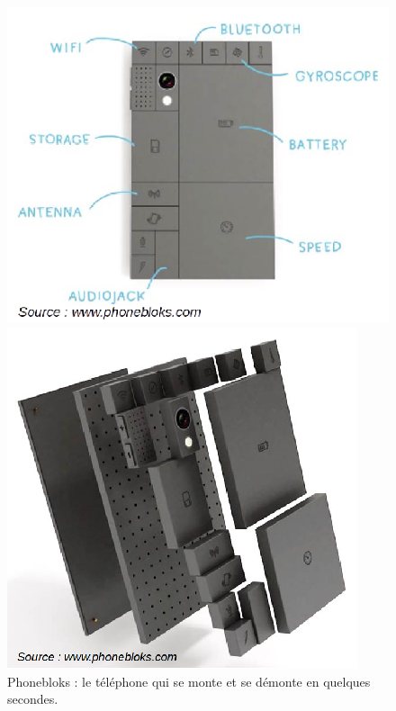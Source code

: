 \begin{figure}[h]
\begin{minipage}{0.5\linewidth}
\begin{center}
\includegraphics[scale=0.6]{Rsc/phonebloks2.png} 
\end{center}
\end{minipage}
\begin{minipage}{0.5\linewidth}
\begin{center}
\includegraphics[scale=0.7]{Rsc/phonebloks1.png} 
\end{center}
\end{minipage}
\caption{\scriptsize{Phonebloks : le téléphone qui se monte et se démonte en quelques secondes.}}
\label{phonebloks}
\end{figure}


